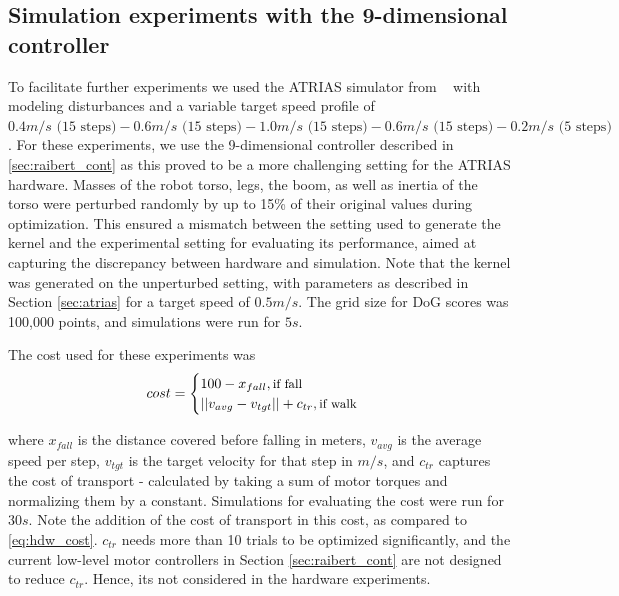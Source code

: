 \subsection{Simulation experiments with the 9-dimensional controller}

\label{sec:exps_sim}

To facilitate further experiments we used the ATRIAS simulator from ~\cite{martin2015robust} with modeling disturbances and a variable target speed profile of $0.4 m/s \text{ (15 steps)} - 0.6 m/s \text{ (15 steps)} - 1.0 m/s \text{ (15 steps)} - 0.6 m/s \text{ (15 steps)} - 0.2 m/s \text{ (5 steps)}$. For these experiments, we use the 9-dimensional controller described in \ref{sec:raibert_cont} as this proved to be a more challenging setting for the ATRIAS hardware. Masses of the robot torso, legs, the boom, as well as inertia of the torso were perturbed randomly by up to 15\% of their original values during optimization. This ensured a mismatch between the setting used to generate the kernel and the experimental setting for evaluating its performance, aimed at capturing the discrepancy between hardware and simulation. Note that the kernel was generated on the unperturbed setting, with parameters as described in Section \ref{sec:atrias} for a target speed of $0.5m/s$. The grid size for DoG scores was 100,000 points, and simulations were run for $5s$.

The cost used for these experiments was
\begin{equation}
\label{eq:cost_sim}
cost = 		
    \begin{cases}
		100 - x_{fall} , \text{\small{if fall}} \\
		||v_{avg} - v_{tgt}|| + c_{tr}, \text{\small{if walk}}\\
	\end{cases}
\end{equation}

where $x_{fall}$ is the distance covered before falling in meters, $v_{avg}$ is the average speed per step, $v_{tgt}$ is the target velocity for that step in $m/s$, and $c_{tr}$ captures the cost of transport - calculated by taking a sum of motor torques and normalizing them by a constant. Simulations for evaluating the cost were run for $30s$. Note the addition of the cost of transport in this cost, as compared to \ref{eq:hdw_cost}. $c_{tr}$ needs more than 10 trials to be optimized significantly, and the current low-level motor controllers in Section \ref{sec:raibert_cont} are not designed to reduce $c_{tr}$. Hence, its not considered in the hardware experiments.

